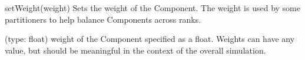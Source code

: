 \begin{functiondoc}{setWeight(weight)}{
  Sets the weight of the Component.  The weight is used by some
  partitioners to help balance Components across ranks.
}

 (type: float) weight of the Component specified as a
float.  Weights can have any value, but should be meaningful in the
context of the overall simulation.

\noreturn
\end{functiondoc}

